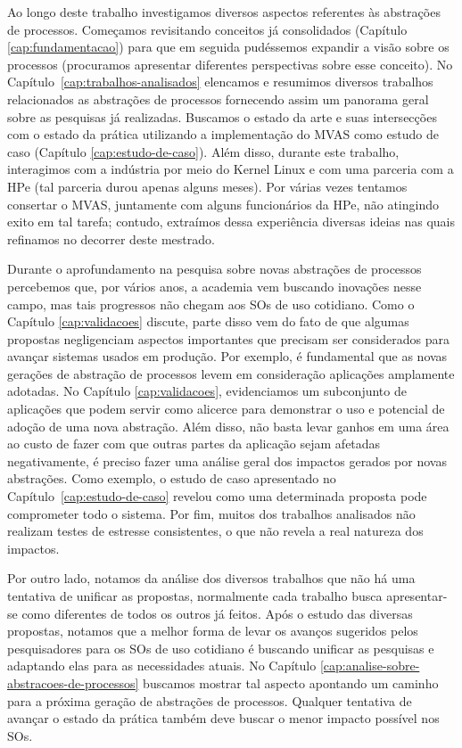 \label{cap:conclusoes}

Ao longo deste trabalho investigamos diversos aspectos referentes às abstrações
de processos. Começamos revisitando conceitos já consolidados (Capítulo
\ref{cap:fundamentacao}) para que em seguida pudéssemos expandir a visão sobre
os processos (procuramos apresentar diferentes perspectivas sobre esse conceito).
No Capítulo~\ref{cap:trabalhos-analisados} elencamos e resumimos diversos
trabalhos relacionados as abstrações de processos fornecendo assim um panorama
geral sobre as pesquisas já realizadas. Buscamos o estado da arte e suas
intersecções com o estado da prática utilizando a implementação do MVAS como
estudo de caso (Capítulo \ref{cap:estudo-de-caso}). Além disso, durante este
trabalho, interagimos com a indústria por meio do Kernel Linux e com uma
parceria com a HPe (tal parceria durou apenas alguns meses). Por várias vezes
tentamos consertar o MVAS, juntamente com alguns funcionários da HPe, não
atingindo exito em tal tarefa; contudo, extraímos dessa experiência diversas
ideias nas quais refinamos no decorrer deste mestrado.

Durante o aprofundamento na pesquisa sobre novas abstrações de processos
percebemos que, por vários anos, a academia vem buscando inovações nesse campo,
mas tais progressos não chegam aos SOs de uso cotidiano. Como o Capítulo
\ref{cap:validacoes} discute, parte disso vem do fato de que algumas propostas
negligenciam aspectos importantes que precisam ser considerados para avançar
sistemas usados em produção. Por exemplo, é fundamental que as novas gerações
de abstração de processos levem em consideração aplicações amplamente adotadas.
No Capítulo \ref{cap:validacoes}, evidenciamos um subconjunto de aplicações que
podem servir como alicerce para demonstrar o uso e potencial de adoção de uma
nova abstração. Além disso, não basta levar ganhos em uma área ao custo de
fazer com que outras partes da aplicação sejam afetadas negativamente, é preciso
fazer uma análise geral dos impactos gerados por novas abstrações. Como
exemplo, o estudo de caso apresentado no Capítulo~\ref{cap:estudo-de-caso}
revelou como uma determinada proposta pode comprometer todo o sistema. Por
fim, muitos dos trabalhos analisados não realizam testes de estresse
consistentes, o que não revela a real natureza dos impactos.

Por outro lado, notamos da análise dos diversos trabalhos que não há uma
tentativa de unificar as propostas, normalmente cada trabalho busca
apresentar-se como diferentes de todos os outros já feitos. Após o estudo das
diversas propostas, notamos que a melhor forma de levar os avanços sugeridos
pelos pesquisadores para os SOs de uso cotidiano é buscando unificar as
pesquisas e adaptando elas para as necessidades atuais. No Capítulo
\ref{cap:analise-sobre-abstracoes-de-processos} buscamos mostrar tal aspecto
apontando um caminho para a próxima geração de abstrações de processos.
Qualquer tentativa de avançar o estado da prática também deve buscar o menor
impacto possível nos SOs.

